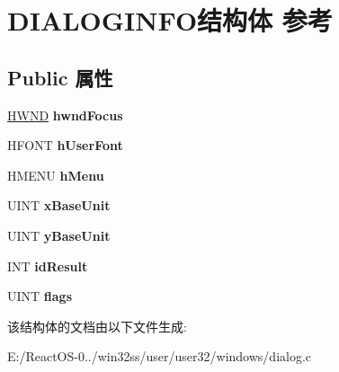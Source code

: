 \hypertarget{struct_d_i_a_l_o_g_i_n_f_o}{}\section{D\+I\+A\+L\+O\+G\+I\+N\+F\+O结构体 参考}
\label{struct_d_i_a_l_o_g_i_n_f_o}
\subsection*{Public 属性}
\begin{DoxyCompactItemize}
\item 
\mbox{\label{struct_d_i_a_l_o_g_i_n_f_o_aa6986667099d36fd7d10989b16f0dc3b}} 
\hyperlink{interfacevoid}{H\+W\+ND} {\bfseries hwnd\+Focus}
\item 
\mbox{\label{struct_d_i_a_l_o_g_i_n_f_o_ab3c92f84e1d388d97c12fcee620c7c85}} 
H\+F\+O\+NT {\bfseries h\+User\+Font}
\item 
\mbox{\label{struct_d_i_a_l_o_g_i_n_f_o_abda49952ef54b72bd8c1ba715510f6cd}} 
H\+M\+E\+NU {\bfseries h\+Menu}
\item 
\mbox{\label{struct_d_i_a_l_o_g_i_n_f_o_a6ed21b3b2aeb1dbce47e72cef7412697}} 
U\+I\+NT {\bfseries x\+Base\+Unit}
\item 
\mbox{\label{struct_d_i_a_l_o_g_i_n_f_o_ae8ee1bcd533b36d11111ea16199180c0}} 
U\+I\+NT {\bfseries y\+Base\+Unit}
\item 
\mbox{\label{struct_d_i_a_l_o_g_i_n_f_o_abf7fab4f0a249417968e5b5ce21b86bf}} 
I\+NT {\bfseries id\+Result}
\item 
\mbox{\label{struct_d_i_a_l_o_g_i_n_f_o_a3c69f1c3e9b989960f8747e800589a11}} 
U\+I\+NT {\bfseries flags}
\end{DoxyCompactItemize}


该结构体的文档由以下文件生成\+:\begin{DoxyCompactItemize}
\item 
E\+:/\+React\+O\+S-\/0../win32ss/user/user32/windows/dialog.\+c\end{DoxyCompactItemize}
